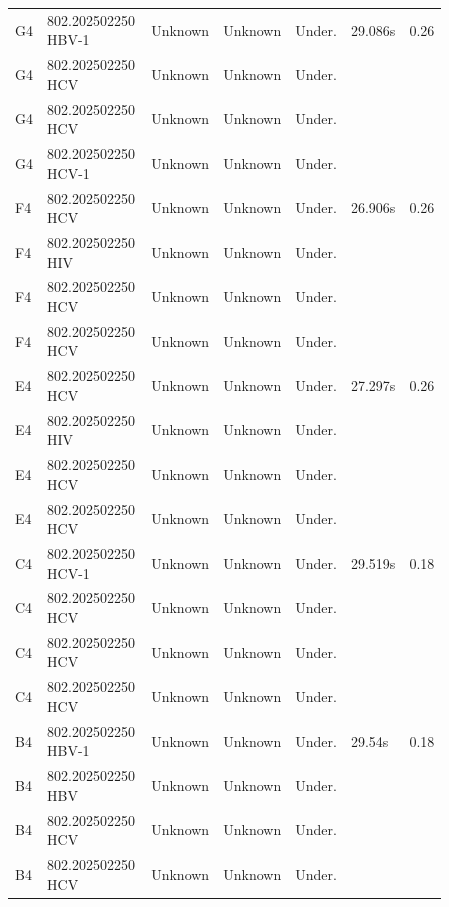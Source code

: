\documentclass[UTF8,10pt,a4paper,fontset=fandol]{ctexart}
\begin{document}
\begin{center}
\small
\begin{tabular}{@{}p{0.06\linewidth}p{0.24\linewidth}p{0.12\linewidth}p{0.12\linewidth}p{0.12\linewidth}p{0.12\linewidth}p{0.08\linewidth}@{}}
G4 & 802.202502250 HBV-1 & Unknown & Unknown & Under. & 29.086s & 0.26 \\
G4 & 802.202502250 HCV   & Unknown & Unknown & Under. &             &      \\
G4 & 802.202502250 HCV   & Unknown & Unknown & Under. &             &      \\
G4 & 802.202502250 HCV-1 & Unknown & Unknown & Under. &             &      \\
\hline
F4 & 802.202502250 HCV   & Unknown & Unknown & Under. & 26.906s & 0.26 \\
F4 & 802.202502250 HIV   & Unknown & Unknown & Under. &             &      \\
F4 & 802.202502250 HCV   & Unknown & Unknown & Under. &             &      \\
F4 & 802.202502250 HCV   & Unknown & Unknown & Under. &             &      \\
\hline
E4 & 802.202502250 HCV   & Unknown & Unknown & Under. & 27.297s & 0.26 \\
E4 & 802.202502250 HIV   & Unknown & Unknown & Under. &             &      \\
E4 & 802.202502250 HCV   & Unknown & Unknown & Under. &             &      \\
E4 & 802.202502250 HCV   & Unknown & Unknown & Under. &             &      \\
\hline
C4 & 802.202502250 HCV-1 & Unknown & Unknown & Under. & 29.519s & 0.18 \\
C4 & 802.202502250 HCV   & Unknown & Unknown & Under. &             &      \\
C4 & 802.202502250 HCV   & Unknown & Unknown & Under. &             &      \\
C4 & 802.202502250 HCV   & Unknown & Unknown & Under. &             &      \\
\hline
B4 & 802.202502250 HBV-1 & Unknown & Unknown & Under. & 29.54s  & 0.18 \\
B4 & 802.202502250 HBV   & Unknown & Unknown & Under. &             &      \\
B4 & 802.202502250 HCV   & Unknown & Unknown & Under. &             &      \\
B4 & 802.202502250 HCV   & Unknown & Unknown & Under. &             &      \\
\end{tabular}
\end{center}
\end{document}
